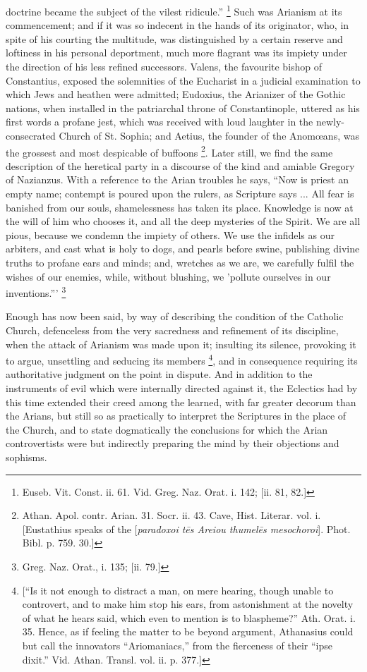 doctrine became the subject of the vilest ridicule.'' \footnote{Euseb. Vit. Const. ii. 61. Vid. Greg. Naz.
Orat. i. 142; [ii. 81, 82.]} Such was Arianism at its commencement; and if it was so
indecent in the hands of its originator, who, in spite of his courting
the multitude, was distinguished by a certain reserve and loftiness in
his personal deportment, much more flagrant was its impiety under the
direction of his less refined successors. Valens, the favourite bishop
of Constantius, exposed the solemnities of the Eucharist in a judicial
examination to which Jews and heathen were admitted; Eudoxius, the
Arianizer of the Gothic nations, when installed in the patriarchal
throne of Constantinople, uttered as his first words a profane jest,
which was received with loud laughter in the newly-consecrated Church
of St. Sophia; and Aetius, the founder of the Anomœans, was the
grossest and most despicable of buffoons \footnote{Athan. Apol. contr. Arian. 31. Socr. ii. 43.
Cave, Hist. Literar. vol. i. [Eustathius speaks of the [\emph{paradoxoi t\={e}s
Areiou thumel\={e}s mesochoroi}]. Phot. Bibl. p. 759. 30.]}. Later still, we find the same description of the heretical
party in a discourse of the kind and amiable Gregory of Nazianzus.
With a reference to the Arian troubles he says, ``Now is priest an
empty name; contempt is poured upon the rulers, as Scripture says ...
All fear is banished from our souls, shamelessness has taken its
place. Knowledge is now at the will of him who chooses it, and all the
deep mysteries of the Spirit. We are all pious, because we condemn the
impiety of others. We use the infidels as our arbiters, and cast what
is holy to dogs, and pearls before swine, publishing divine truths to
profane ears and minds; and, wretches as we are, we carefully fulfil
the wishes of our enemies, while, without blushing, we 'pollute
ourselves in our inventions.''' \footnote{Greg. Naz. Orat., i. 135; [ii. 79.]}

Enough has now been said, by way of describing the condition of the
Catholic Church, defenceless from the very sacredness and refinement
of its discipline, when the attack of Arianism was made upon it;
insulting its silence, provoking it to argue, unsettling and seducing
its members \footnote{[``Is it not enough to distract a man,
on mere hearing, though unable to controvert, and to make him stop his
ears, from astonishment at the novelty of what he hears said, which
even to mention is to blaspheme?'' Ath. Orat. i. 35. Hence, as if
feeling the matter to be beyond argument, Athanasius could but call
the innovators ``Ariomaniacs,'' from the fierceness of their
``ipse dixit.'' Vid. Athan. Transl. vol. ii. p. 377.]}, and in
consequence requiring its authoritative judgment on the point in
dispute. And in addition to the instruments of evil which were
internally directed against it, the Eclectics had by this time
extended their creed among the learned, with far greater decorum than
the Arians, but still so as practically to interpret the Scriptures in
the place of the Church, and to state dogmatically the conclusions for
which the Arian controvertists were but indirectly preparing the mind
by their objections and sophisms.

